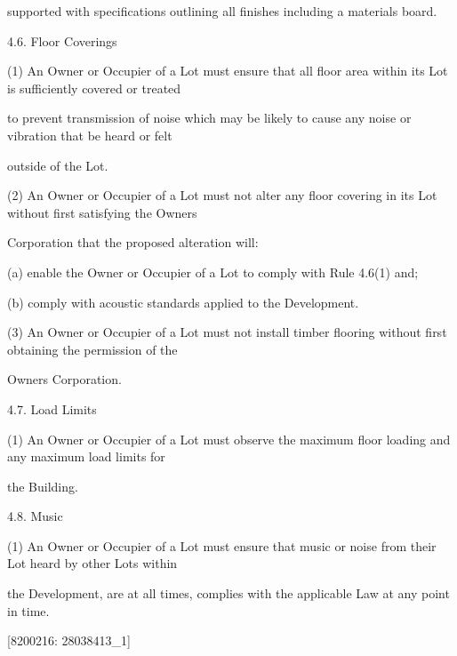 \documentclass{article}
\begin{document}
{\fontsize{10.02}{1}supported with specifications outlining all finishes including a materials board. }

{\fontsize{9.99}{1}4.6. Floor Coverings }

{\fontsize{9.962}{1}(1) An Owner or Occupier of a Lot must ensure that all floor area within its Lot is sufficiently covered or treated }

{\fontsize{10.02}{1}to prevent transmission of noise which may be likely to cause any noise or vibration that be heard or felt }

{\fontsize{10.02}{1}outside of the Lot. }

{\fontsize{9.962}{1}(2) An Owner or Occupier of a Lot must not alter any floor covering in its Lot without first satisfying the Owners }

{\fontsize{10.02}{1}Corporation that the proposed alteration will: }

{\fontsize{9.962}{1}(a) enable the Owner or Occupier of a Lot to comply with Rule 4.6(1) and; }

{\fontsize{9.962}{1}(b) comply with acoustic standards applied to the Development. }

{\fontsize{9.962}{1}(3) An Owner or Occupier of a Lot must not install timber flooring without first obtaining the permission of the }

{\fontsize{10.02}{1}Owners Corporation. }

{\fontsize{9.99}{1}4.7. Load Limits }

{\fontsize{9.962}{1}(1) An Owner or Occupier of a Lot must observe the maximum floor loading and any maximum load limits for }

{\fontsize{10.02}{1}the Building. }

{\fontsize{9.99}{1}4.8. Music }

{\fontsize{9.962}{1}(1) An Owner or Occupier of a Lot must ensure that music or noise from their Lot heard by other Lots within }

{\fontsize{10.02}{1}the Development, are at all times, complies with the applicable Law at any point in time. }

\newpage
















{\fontsize{7.02}{1}[8200216: 28038413\_1] }
\end{document}
